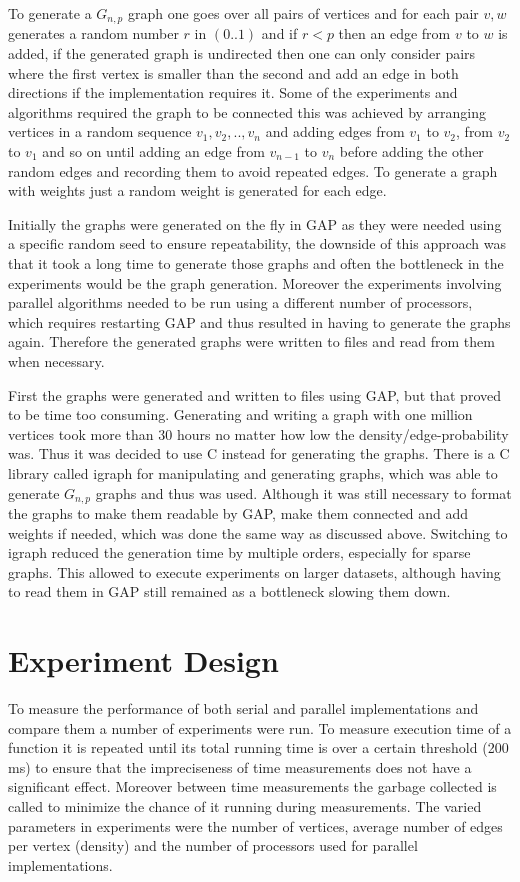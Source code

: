 \documentclass{report}
\theoremstyle{plain}
\theoremstyle{definition}
\theoremstyle{remark}
\begin{document}
To generate a $G_{n,p}$ graph one goes over all pairs of vertices and for each pair $v,w$ generates a random number $r$ in $(0..1)$ and if $r < p$ then an edge from $v$ to $w$ is added, if the generated graph is undirected then one can only consider pairs where the first vertex is smaller than the second and add an edge in both directions if the implementation requires it. Some of the experiments and algorithms required the graph to be connected this was achieved by arranging vertices in a random sequence $v_1,v_2,..,v_n$ and adding edges from $v_1$ to $v_2$, from $v_2$ to $v_1$ and so on until adding an edge from $v_{n-1}$ to $v_n$  before adding the other random edges and recording them to avoid repeated edges. To generate a graph with weights just a random weight is generated for each edge.

Initially the graphs were generated on the fly in GAP as they were needed  using a specific random seed to ensure repeatability, the downside of this approach was that it took a long time to generate those graphs and often the bottleneck in the experiments would be the graph generation. Moreover the experiments involving parallel algorithms needed to be run using a different number of processors, which requires restarting GAP and thus resulted in having to generate the graphs again. Therefore the generated graphs were written to files and read from them when necessary.

First the graphs were generated and written to files using GAP, but that proved to be time too consuming. Generating and writing a graph with one million vertices took more than 30 hours no matter how low the density/edge-probability was. Thus it was decided to use C instead for generating the graphs. There is a C library called igraph for manipulating and generating graphs, which was able to generate $G_{n,p}$ graphs and thus was used. Although it was still necessary to format the graphs to make them readable by GAP, make them connected and add weights if needed, which was done the same way as discussed above. Switching to igraph reduced the generation time by multiple orders, especially for sparse graphs. This allowed to execute experiments on larger datasets, although having to read them in GAP still remained as a bottleneck slowing them down.

\section{Experiment Design}

To measure the performance of both serial and parallel implementations and compare them a number of experiments were run. To measure execution time of a function it is repeated until its total running time is over a certain threshold (200 ms) to ensure that the impreciseness of time measurements does not have a significant effect. Moreover between time measurements the garbage collected is called to minimize the chance of it running during measurements. The varied parameters in experiments were the number of vertices, average number of edges per vertex (density) and the number of processors used for parallel implementations.
\end{document}

